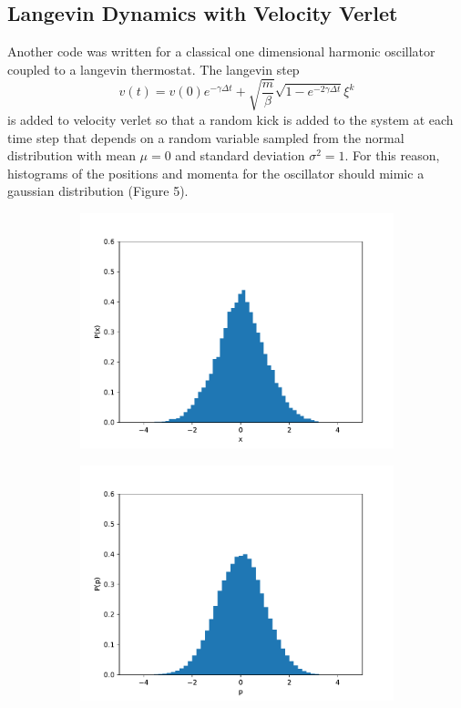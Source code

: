 \documentclass{article}
\newcommand{\be}{\begin{equation}}
\newcommand{\ee}{\end{equation}}
\begin{document}
\subsection{Langevin Dynamics with Velocity Verlet}
Another code was written for a classical one dimensional harmonic oscillator coupled to a langevin thermostat.
The langevin step
\be
  v(t) = v(0)e^{- \gamma \Delta t} + \sqrt{\frac{m}{\beta}}\sqrt{1-e^{-2 \gamma \Delta t}} \xi^{k}
\ee
is added to velocity verlet so that a random kick is added to the system at each time step that depends on a random variable sampled from the normal distribution with mean $\mu = 0$ and standard deviation $\sigma^2 = 1$.
For this reason, histograms of the positions and momenta for the oscillator should mimic a gaussian distribution (Figure 5).
\begin{figure}[H]
    \centering
    \begin{subfigure}[b]{0.49\textwidth}
        \includegraphics[width=\textwidth]{Figures/langevin/xhist.pdf}
    \end{subfigure}
    \begin{subfigure}[b]{0.49\textwidth}
        \includegraphics[width=\textwidth]{Figures/langevin/phist.pdf}

\end{subfigure}
\end{figure}
\end{document}
